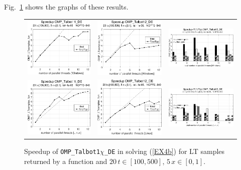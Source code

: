 \documentclass[a4paper,10pt]{report}%
\begin{document}
Fig.~\ref{PAR_EX4b_speedup_fun2} shows the graphs of these results.
\begin{figure}[htb]
\centering
\begin{tabular}{ccc} %
\includegraphics[height=0.2\textwidth]{./FIGS/EX4b/EX4b_fun_speedup_11_20t_100_Windows.eps} &
\includegraphics[height=0.2\textwidth]{./FIGS/EX4b/EX4b_fun_speedup_12_20t_100_Windows.eps} &
\includegraphics[height=0.2\textwidth,keepaspectratio=true]{./FIGS/EX4b/EX4b_fun_speedup_13_20t_100_Windows.eps} \\
\includegraphics[height=0.2\textwidth]{./FIGS/EX4b/EX4b_fun_speedup_11_20t_100_Linux.eps} &
\includegraphics[height=0.2\textwidth]{./FIGS/EX4b/EX4b_fun_speedup_12_20t_100_Linux.eps} &
\includegraphics[height=0.2\textwidth,keepaspectratio=true]{./FIGS/EX4b/EX4b_fun_speedup_13_20t_100_Linux.eps}
\end{tabular}
\caption{\small Speedup of {\tt OMP\_Talbot1$\chi$\_DE} in solving (\ref{EX4b}) for LT samples
returned by a function and $20\,t\in[100,500]$, $5\,x\in[0,1]$.}
\label{PAR_EX4b_speedup_fun2}
\end{figure}
\end{document}
